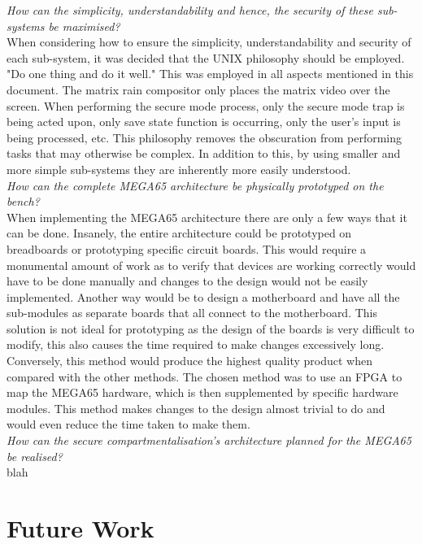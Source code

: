 \textit{How can the simplicity, understandability and hence, the security of these sub-systems be maximised?}\\
When considering how to ensure the simplicity, understandability and security of each sub-system, it was decided that the UNIX philosophy should be employed. "Do one thing and do it well." This was employed in all aspects mentioned in this document. The matrix rain compositor only places the matrix video over the screen. When performing the secure mode process, only the secure mode trap is being acted upon, only save state function is occurring, only the user's input is being processed, etc. This philosophy removes the obscuration from performing tasks that may otherwise be complex. In addition to this, by using smaller and more simple sub-systems they are inherently more easily understood. 
\\
\textit{How can the complete MEGA65 architecture be physically prototyped on the bench?}\\
When implementing the MEGA65 architecture there are only a few ways that it can be done. Insanely, the entire architecture could be prototyped on breadboards or prototyping specific circuit boards. This would require a monumental amount of work as to verify that devices are working correctly would have to be done manually and changes to the design would not be easily implemented. Another way would be to design a motherboard and have all the sub-modules as separate boards that all connect to the motherboard. This solution is not ideal for prototyping as the design of the boards is very difficult to modify, this also causes the time required to make changes excessively long. Conversely, this method would produce the highest quality product when compared with the other methods. The chosen method was to use an FPGA to map the MEGA65 hardware, which is then supplemented by specific hardware modules. This method makes changes to the design almost trivial to do and would even reduce the time taken to make them.
\\
\textit{How can the secure compartmentalisation's architecture planned for the MEGA65 be realised?}\\
blah
\\



\section{Future Work}

